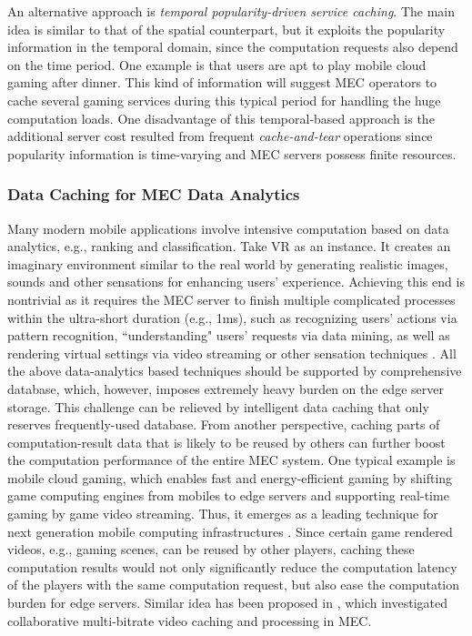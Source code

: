 \documentclass[journal]{IEEEtran}
\begin{document}
{An alternative approach is \emph{temporal popularity-driven service caching}. The main idea is similar to that of the spatial counterpart, but it exploits the popularity information in the temporal domain, since the computation requests also depend on the time period. One example is that users are apt to play mobile cloud gaming after dinner. This kind of information will suggest MEC operators to cache several gaming services during this typical period for handling the huge computation loads. One disadvantage of this temporal-based approach is the additional server cost resulted from frequent \emph{cache-and-tear} operations since popularity information is time-varying and MEC servers possess finite resources.

\subsubsection{\textbf{Data Caching for MEC Data Analytics}}
Many modern mobile applications involve intensive computation based on data analytics, e.g., ranking and classification. Take VR as an instance. It creates an imaginary environment similar to the real world by generating realistic images, sounds and other sensations for enhancing users' experience. Achieving this end is nontrivial as it requires the MEC server to finish multiple complicated processes within the ultra-short duration (e.g., 1ms), such as recognizing users' actions via pattern recognition, ``understanding" users' requests via data mining, as well as rendering virtual settings via video streaming or other sensation techniques \cite{rheingold1991virtual}. All the above data-analytics based techniques should be supported by comprehensive database, which, however, imposes extremely heavy burden on the edge server storage. This challenge can be relieved by intelligent data caching that only reserves frequently-used database. From another perspective, caching parts of computation-result data that is likely to be reused by others can further boost the computation performance of the entire MEC system. One typical example is mobile cloud gaming, which enables fast and energy-efficient gaming by shifting game computing engines from mobiles to edge servers and supporting real-time gaming by game video streaming. Thus, it emerges as a leading technique for next generation mobile computing infrastructures \cite{wang2009modeling}. Since certain game rendered videos, e.g., gaming scenes, can be reused by other players, caching these computation results would not only significantly reduce the computation latency of the players with the same computation request, but also ease the computation burden for edge servers. Similar idea has been proposed in \cite{tran2016collaborative}, which investigated collaborative multi-bitrate video caching and processing in MEC.

}
\end{document}
